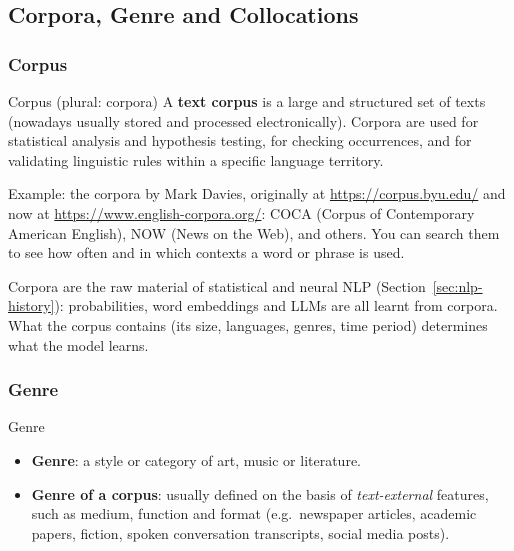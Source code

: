 \subsection{Corpora, Genre and Collocations}
\label{sec:corpora}

\subsubsection{Corpus}

\begin{nbdef}{Corpus (plural: corpora)}
A \textbf{text corpus} is a large and structured set of texts (nowadays usually stored
and processed electronically). Corpora are used for statistical analysis and hypothesis
testing, for checking occurrences, and for validating linguistic rules within a specific
language territory.
\end{nbdef}

Example: the corpora by Mark Davies, originally at \url{https://corpus.byu.edu/} and now
at \url{https://www.english-corpora.org/}: COCA (Corpus of Contemporary American English),
NOW (News on the Web), and others. You can search them to see how often and in which
contexts a word or phrase is used.

\begin{nbwhy}
Corpora are the raw material of statistical and neural NLP
(Section~\ref{sec:nlp-history}): probabilities, word embeddings and LLMs are all learnt
from corpora. What the corpus contains (its size, languages, genres, time period)
determines what the model learns.
\end{nbwhy}

\subsubsection{Genre}

\begin{nbdef}{Genre}
\begin{itemize}[nosep]
  \item \textbf{Genre}: a style or category of art, music or literature.
  \item \textbf{Genre of a corpus}: usually defined on the basis of
        \emph{text-external} features, such as medium, function and format (e.g.\
        newspaper articles, academic papers, fiction, spoken conversation transcripts,
        social media posts).
\end{itemize}
\end{nbdef}

